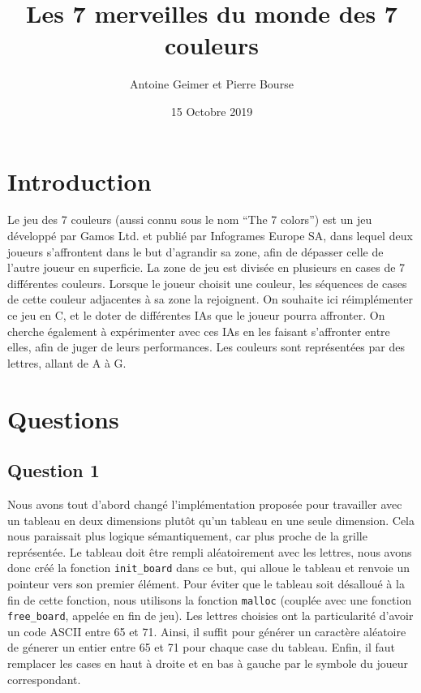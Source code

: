 \documentclass{article}
\title{Les 7 merveilles du monde des 7 couleurs}
\date{15 Octobre 2019}
\author{Antoine Geimer et Pierre Bourse}
\begin{document}
\maketitle

\section{Introduction}
    \quad Le jeu des 7 couleurs (aussi connu sous le nom \enquote{The 7 colors}) est un jeu développé par Gamos Ltd. et publié par Infogrames Europe SA, dans lequel deux joueurs s'affrontent dans le but d'agrandir sa zone, afin de dépasser celle de l'autre joueur en superficie. La zone de jeu est divisée en plusieurs en cases de 7 différentes couleurs. Lorsque le joueur choisit une couleur, les séquences de cases de cette couleur adjacentes à sa zone la rejoignent. On souhaite ici réimplémenter ce jeu en C, et le doter de différentes IAs que le joueur pourra affronter. On cherche également à expérimenter avec ces IAs en les faisant s'affronter entre elles, afin de juger de leurs performances. Les couleurs sont représentées par des lettres, allant de A à G.
\section{Questions}
\subsection{Question 1}
    Nous avons tout d'abord changé l'implémentation proposée pour travailler avec un tableau en deux dimensions plutôt qu'un tableau en une seule dimension. Cela nous paraissait plus logique sémantiquement, car plus proche de la grille représentée. Le tableau doit être rempli aléatoirement avec les lettres, nous avons donc créé la fonction \texttt{init\_board} dans ce but, qui alloue le tableau et renvoie un pointeur vers son premier élément. Pour éviter que le tableau soit désalloué à la fin de cette fonction, nous utilisons la fonction \texttt{malloc} (couplée avec une fonction \texttt{free\_board}, appelée en fin de jeu). Les lettres choisies ont la particularité d'avoir un code ASCII entre 65 et 71. Ainsi, il suffit pour générer un caractère aléatoire de génerer un entier entre 65 et 71 pour chaque case du tableau. Enfin, il faut remplacer les cases en haut à droite et en bas à gauche par le symbole du joueur correspondant.
\end{document}
